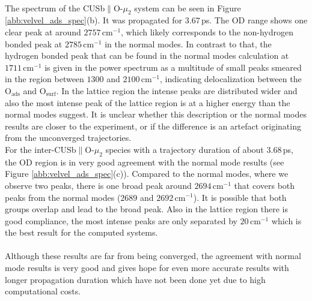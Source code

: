 \documentclass[11pt,DIV=13,BCOR=5mm,a4paper,headinclude]{scrbook}
\begin{document}
\\
The spectrum of the CUSb$\parallel$O-$\mu_2$ system can be seen in Figure \ref{abb:velvel_ads_spec}(b).
It was propagated for $3.67\,$ps.
The OD range shows one clear peak at around $2757\,$cm$^{-1}$, which likely corresponds to the non-hydrogen bonded peak at $2785\,$cm$^{-1}$ in the normal modes.
In contrast to that, the hydrogen bonded peak that can be found in the normal modes calculation at $1711\,$cm$^{-1}$ is given in the power spectrum as a multitude of small peaks smeared in the region between $1300$ and $2100\,$cm$^{-1}$, indicating delocalization between the O$_\textrm{ads}$ and O$_\textrm{surf}$.
In the lattice region the intense peaks are distributed wider and also the most intense peak of the lattice region is at a higher energy than the normal modes suggest.
It is unclear whether this description or the normal modes results are closer to the experiment, or if the difference is an artefact originating from the unconverged trajectories.
\\
For the inter-CUSb$\parallel$O-$\mu_2$ species with a trajectory duration of about $3.68\,$ps, the OD region is in very good agreement with the normal mode results (see Figure \ref{abb:velvel_ads_spec}(c)).
Compared to the normal modes, where we observe two peaks, there is one broad peak around $2694\,$cm$^{-1}$ that covers both peaks from the normal modes ($2689$ and $2692\,$cm$^{-1}$).
It is possible that both groups overlap and lead to the broad peak.
Also in the lattice region there is good compliance, the most intense peaks are only separated by $20\,$cm$^{-1}$ which is the best result for the computed systems.
\\
\\
Although these results are far from being converged, the agreement with normal mode results is very good and gives hope for even more accurate results with longer propagation duration which have not been done yet due to high computational costs.

\end{document}
